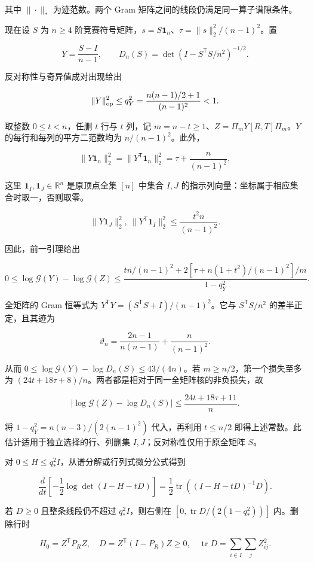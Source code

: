 \documentclass[11pt,a4paper]{article}
\begin{document}
其中 \(\|\cdot\|_*\) 为迹范数。两个 Gram 矩阵之间的线段仍满足同一算子谱隙条件。

现在设 \(S\) 为 \(n\ge4\) 阶竞赛符号矩阵，\(s=S\mathbf 1_n\)、\(\tau=\|s\|_2^2/(n-1)^2\)。置

\[
Y=\frac{S-I}{n-1},\qquad D_n(S)=\det(I-S^{\mathsf T}S/n^2)^{-1/2}.
\]

反对称性与奇异值成对出现给出

\[
\|Y\|_{\rm op}^2\le q_Y^2=\frac{n(n-1)/2+1}{(n-1)^2}<1.
\]

取整数 \(0\le t<n\)，任删 \(t\) 行与 \(t\) 列，记 \(m=n-t\ge1\)、\(Z=\Pi_mY[R,T]\Pi_m\)。\(Y\) 的每行和每列的平方二范数均为 \(n/(n-1)^2\)。此外，

\[
\|Y\mathbf 1_n\|_2^2=\|Y^{\mathsf T}\mathbf 1_n\|_2^2=\tau+\frac n{(n-1)^2},
\]

这里 \(\mathbf1_I,\mathbf1_J\in\mathbb R^n\) 是原顶点全集 \([n]\) 中集合 \(I,J\) 的指示列向量：坐标属于相应集合时取一，否则取零。

\[
\|Y\mathbf 1_J\|_2^2,\ \|Y^{\mathsf T}\mathbf 1_I\|_2^2\le\frac{t^2n}{(n-1)^2}.
\]

因此，前一引理给出

\[
0\le\log\mathcal G(Y)-\log\mathcal G(Z)\le\frac{t n/(n-1)^2+2[\tau+n(1+t^2)/(n-1)^2]/m}{1-q_Y^2}.
\]

全矩阵的 Gram 恒等式为 \(Y^{\mathsf T}Y=(S^{\mathsf T}S+I)/(n-1)^2\)。它与 \(S^{\mathsf T}S/n^2\) 的差半正定，且其迹为

\[
\vartheta_n=\frac{2n-1}{n(n-1)}+\frac n{(n-1)^2}.
\]

从而 \(0\le\log\mathcal G(Y)-\log D_n(S)\le43/(4n)\)。若 \(m\ge n/2\)，第一个损失至多为 \((24t+18\tau+8)/n\)。两者都是相对于同一全矩阵核的非负损失，故

\[
|\log\mathcal G(Z)-\log D_n(S)|\le\frac{24t+18\tau+11}{n}.
\]

将 \(1-q_Y^2=n(n-3)/(2(n-1)^2)\) 代入，再利用 \(t\le n/2\) 即得上述常数。此估计适用于独立选择的行、列删集 \(I,J\)；反对称性仅用于原全矩阵 \(S\)。

对 \(0\le H\le q_*^2I\)，从谱分解或行列式微分公式得到

\[
\frac{d}{dt}\left[-\frac12\log\det(I-H-tD)\right]
=\frac12\operatorname{tr}((I-H-tD)^{-1}D).
\]

若 \(D\ge0\) 且整条线段仍不超过 \(q_*^2I\)，则右侧在 \([0,\operatorname{tr}D/(2(1-q_*^2))]\) 内。删除行时

\[
H_0=Z^{\mathsf T}P_RZ,\quad
D=Z^{\mathsf T}(I-P_R)Z\ge0,\quad
\operatorname{tr}D=\sum_{i\in I}\sum_jZ_{ij}^2.
\]
\end{document}
